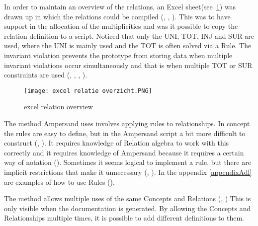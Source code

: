 In order to maintain an overview of the relations, an Excel sheet(see~\ref{fig:excel relation overview}) was drawn up in which the relations could be compiled (, , ).
This was to have support in the allocation of the multiplicities and was it possible to copy the relation definition to a script.
Noticed that only the UNI, TOT, INJ and SUR are used, where the UNI is mainly used and the TOT is often solved via a Rule.
The invariant violation prevents the prototype from storing data when multiple invariant violations occur simultaneously and that is when multiple TOT or SUR constraints are used (, , , ).
\begin{figure}[H]
    \centering
    \texttt{[image: excel relatie overzicht.PNG]}
    \caption{excel relation overview}
    \label{fig:excel relation overview}
\end{figure}
{}

The method Ampersand uses involves applying rules to relationships.
In concept the rules are easy to define, but in the Ampersand script a bit more difficult to construct (, ).
It requires knowledge of Relation algebra to work with this correctly and it requires knowledge of Ampersand because it requires a certain way of notation ().
Sometimes it seems logical to implement a rule, but there are implicit restrictions that make it unnecessary (, ).
In the appendix \ref{appendixAdl} are examples of how to use Rules ().

The method allows multiple uses of the same Concepts and Relations (, )
This is only visible when the documentation is generated.
By allowing the Concepts and Relationships multiple times, it is possible to add different definitions to them.

